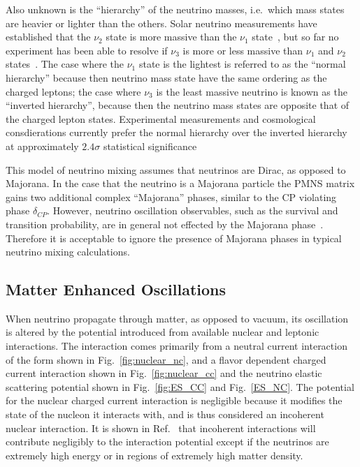 Also unknown is the ``hierarchy'' of the neutrino masses, i.e.\ which
mass states are heavier or lighter than the others.
Solar neutrino measurements have established that the $\nu_{2}$ state
is more massive than the $\nu_{1}$ state~\citep{sno_first, sno_combined}, but so far no experiment has been
able to resolve if $\nu_{3}$ is more or less massive than $\nu_{1}$ and $\nu_{2}$ states~\citep{vogel_hierarchy}.
The case where the $\nu_{1}$ state is the lightest is referred to as the
``normal hierarchy'' because then neutrino mass state have the same
ordering as the charged leptons;
the case where $\nu_{3}$ is the least massive neutrino is known as the
 ``inverted hierarchy'', because then the neutrino mass states are opposite
 that of the charged lepton states.
 Experimental measurements and cosmological consdierations currently prefer
 the normal hierarchy over the inverted hierarchy at approximately $2.4\sigma$ statistical
 significance~\citep{nu_fit}

This model of neutrino mixing assumes that neutrinos are Dirac, as opposed to
Majorana. In the case that the neutrino is a Majorana particle the PMNS matrix
gains two additional complex ``Majorana'' phases, similar to the CP violating
phase $\delta_{CP}$.
However, neutrino oscillation observables, such as the survival and transition
probability, are in general not effected by the Majorana phase~\citep{majorana_mixing}.
Therefore it is acceptable to ignore the presence of Majorana phases in typical 
neutrino mixing calculations.

\subsection{Matter Enhanced Oscillations}
When neutrino propagate through matter, as opposed to vacuum, its oscillation is altered
by the potential introduced from available nuclear and leptonic interactions.
The interaction comes primarily from a neutral current interaction of the form
shown in Fig.~\ref{fig:nuclear_nc}, and a flavor dependent charged current interaction shown in
Fig.~\ref{fig:nuclear_cc} and the  neutrino elastic scattering potential shown in
Fig.~\ref{fig:ES_CC} and Fig.~\ref{ES_NC}.
The potential for the nuclear charged current interaction is negligible
because it modifies the state of the nucleon it interacts with,
and is thus considered an incoherent nuclear interaction.
It is shown in Ref.~\citep{wolfenstein_osc} that incoherent interactions
will contribute negligibly to the interaction potential except if the neutrinos
are extremely high energy or in regions of extremely high matter density.

